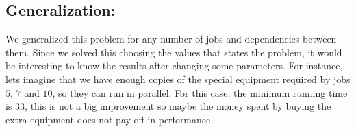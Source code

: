 \subsection*{Generalization:}

We generalized this problem for any number of jobs and dependencies between them. Since we solved this choosing the values that states the problem, it would be interesting  to know the results after changing some parameters. For instance, lets imagine that we have enough copies of the special equipment required by jobs $5$, $7$ and $10$, so they can run in parallel. For this case, the minimum running time is $33$, this is not a big improvement so maybe the money spent by buying the extra equipment does not pay off in performance. 